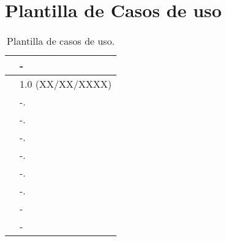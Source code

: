 \section{Plantilla de Casos de uso}

\begin{table}[H]
\begin{center}
\begin{tabular}{|p{3cm}|p{10cm}|} \hline
\centering {\bf UC-XX} & -  \\ \hline\hline
\centering {\bf Versión} & 1.0 (XX/XX/XXXX) \\ \hline
\centering {\bf Dependencias} &  -. \\ \hline
\centering {\bf Descripción} &  -. \\ \hline
\centering {\bf Precondición} &  -. \\ \hline
\centering {\bf Secuencia normal} &  -. \\ \hline
\centering {\bf Postcondición} &  -. \\ \hline
\centering {\bf Excepciones} &  -. \\ \hline
\centering {\bf Importancia} & - \\ \hline
\centering {\bf Urgencia} & - \\ \hline
\end{tabular}
\caption{Plantilla de casos de uso.}
\label{enlaceUCX}
\end{center}
\end{table}